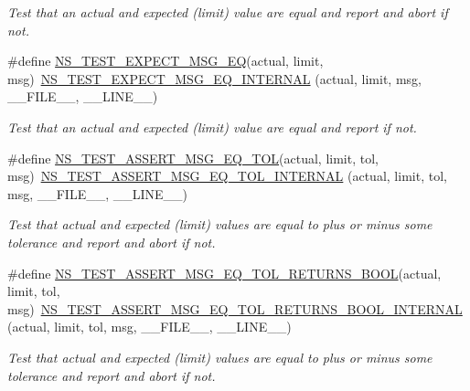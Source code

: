 \begin{DoxyCompactItemize}
\begin{DoxyCompactList}\small\item\em Test that an actual and expected (limit) value are equal and report and abort if not. \end{DoxyCompactList}\item 
\#define \hyperlink{group__testing_ga7304ba46a28d8cf08dfdfd6499cf7068}{N\+S\+\_\+\+T\+E\+S\+T\+\_\+\+E\+X\+P\+E\+C\+T\+\_\+\+M\+S\+G\+\_\+\+EQ}(actual,  limit,  msg)~\hyperlink{group__testingimpl_gaf35a8f7e8a9a1eb011fa6fb33ea721a3}{N\+S\+\_\+\+T\+E\+S\+T\+\_\+\+E\+X\+P\+E\+C\+T\+\_\+\+M\+S\+G\+\_\+\+E\+Q\+\_\+\+I\+N\+T\+E\+R\+N\+AL} (actual, limit, msg, \+\_\+\+\_\+\+F\+I\+L\+E\+\_\+\+\_\+, \+\_\+\+\_\+\+L\+I\+N\+E\+\_\+\+\_\+)
\begin{DoxyCompactList}\small\item\em Test that an actual and expected (limit) value are equal and report if not. \end{DoxyCompactList}\item 
\#define \hyperlink{group__testing_ga9e7861b56b4e70db3b56044cb7a28e41}{N\+S\+\_\+\+T\+E\+S\+T\+\_\+\+A\+S\+S\+E\+R\+T\+\_\+\+M\+S\+G\+\_\+\+E\+Q\+\_\+\+T\+OL}(actual,  limit,  tol,  msg)~\hyperlink{group__testingimpl_ga48c926819b2c033fb5a4c97177efbed7}{N\+S\+\_\+\+T\+E\+S\+T\+\_\+\+A\+S\+S\+E\+R\+T\+\_\+\+M\+S\+G\+\_\+\+E\+Q\+\_\+\+T\+O\+L\+\_\+\+I\+N\+T\+E\+R\+N\+AL} (actual, limit, tol, msg, \+\_\+\+\_\+\+F\+I\+L\+E\+\_\+\+\_\+, \+\_\+\+\_\+\+L\+I\+N\+E\+\_\+\+\_\+)
\begin{DoxyCompactList}\small\item\em Test that actual and expected (limit) values are equal to plus or minus some tolerance and report and abort if not. \end{DoxyCompactList}\item 
\#define \hyperlink{group__testing_ga48231baef222623bcdd2c1bf44e5997e}{N\+S\+\_\+\+T\+E\+S\+T\+\_\+\+A\+S\+S\+E\+R\+T\+\_\+\+M\+S\+G\+\_\+\+E\+Q\+\_\+\+T\+O\+L\+\_\+\+R\+E\+T\+U\+R\+N\+S\+\_\+\+B\+O\+OL}(actual,  limit,  tol,  msg)~\hyperlink{group__testingimpl_ga1fd0b56967248280afec4b3ea83199b3}{N\+S\+\_\+\+T\+E\+S\+T\+\_\+\+A\+S\+S\+E\+R\+T\+\_\+\+M\+S\+G\+\_\+\+E\+Q\+\_\+\+T\+O\+L\+\_\+\+R\+E\+T\+U\+R\+N\+S\+\_\+\+B\+O\+O\+L\+\_\+\+I\+N\+T\+E\+R\+N\+AL} (actual, limit, tol, msg, \+\_\+\+\_\+\+F\+I\+L\+E\+\_\+\+\_\+, \+\_\+\+\_\+\+L\+I\+N\+E\+\_\+\+\_\+)
\begin{DoxyCompactList}\small\item\em Test that actual and expected (limit) values are equal to plus or minus some tolerance and report and abort if not. \end{DoxyCompactList}\item 

\end{DoxyCompactItemize}
